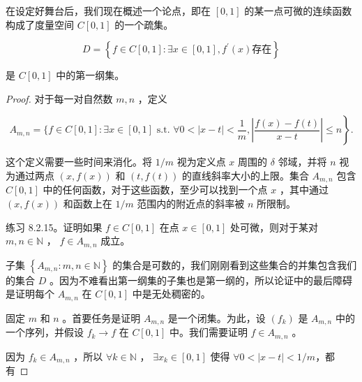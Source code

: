 在设定好舞台后，我们现在概述一个论点，即在 \(\left\lbrack  {0,1}\right\rbrack\) 的某一点可微的连续函数构成了度量空间 \(C\left\lbrack  {0,1}\right\rbrack\) 的一个疏集。



\begin{Thm}
  \label{thm:8.2.12}
\[
D = \left\{  {f \in  C\left\lbrack  {0,1}\right\rbrack   : \exists x \in  \left\lbrack  {0,1}\right\rbrack, {f}^{\prime }\left( x\right)} \text{存在}\right\}
\]

是 \(C\left\lbrack  {0,1}\right\rbrack\) 中的第一纲集。
\end{Thm}


\begin{proof}
对于每一对自然数 \(m,n\) ，定义

\[
  {A}_{m,n} = \{ f \in  C\left\lbrack  {0,1}\right\rbrack   : \exists x \in  \left\lbrack  {0,1}\right\rbrack \text{ s.t. }  \forall 0 < \left| {x - t}\right|  < \frac{1}{m},   \left. \left| \frac{f\left( x\right)  - f\left( t\right) }{x - t}\right|  \leq  n\right\}  .
  \]

这个定义需要一些时间来消化。将 \(1/m\) 视为定义点 \(x\) 周围的 \(\delta\) 邻域，并将 \(n\) 视为通过两点 \(\left( {x,f\left( x\right) }\right)\) 和 \(\left( {t,f\left( t\right) }\right)\) 的直线斜率大小的上限。集合 \({A}_{m,n}\) 包含 \(C\left\lbrack  {0,1}\right\rbrack\) 中的任何函数，对于这些函数，至少可以找到一个点 \(x\) ，其中通过 \(\left( {x,f\left( x\right) }\right)\) 和函数上在 \(1/m\) 范围内的附近点的斜率被 \(n\) 所限制。

练习 8.2.15。证明如果 \(f \in  C\left\lbrack  {0,1}\right\rbrack\) 在点 \(x \in  \left\lbrack  {0,1}\right\rbrack\) 处可微，则对于某对 \(m,n \in  \mathbb{N}\) ， \(f \in  {A}_{m,n}\) 成立。

子集 \(\left\{  {{A}_{m,n} : m,n \in  \mathbb{N}}\right\}\) 的集合是可数的，我们刚刚看到这些集合的并集包含我们的集合 \(D\) 。因为不难看出第一纲集的子集也是第一纲的，所以论证中的最后障碍是证明每个 \({A}_{m,n}\) 在 \(C\left\lbrack  {0,1}\right\rbrack\) 中是无处稠密的。

固定 \(m\) 和 \(n\) 。首要任务是证明 \({A}_{m,n}\) 是一个闭集。为此，设 \(\left( {f}_{k}\right)\) 是 \({A}_{m,n}\) 中的一个序列，并假设 \({f}_{k} \rightarrow  f\) 在 \(C\left\lbrack  {0,1}\right\rbrack\) 中。我们需要证明 \(f \in  {A}_{m,n}\) 。

因为 \({f}_{k} \in  {A}_{m,n}\) ，所以 \(\forall k \in  \mathbb{N}\) ， \(\exists {x}_{k} \in  \left\lbrack  {0,1}\right\rbrack\) 使得 $\forall 0 < \left| {x - t}\right|  < 1/m$，都有


\end{proof}
